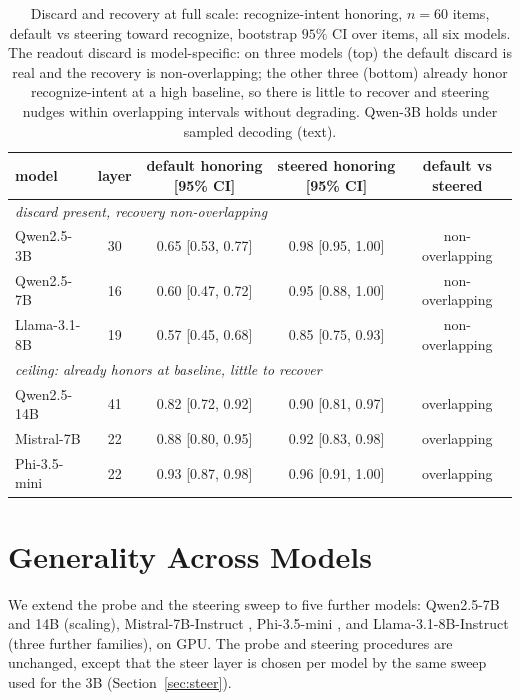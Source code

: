 \documentclass[11pt]{article}
\begin{document}
\begin{table}[t]
\centering\small
\setlength{\tabcolsep}{14pt}
\begin{tabular}{lcccc}
\toprule
model & layer & default honoring [95\% CI] & steered honoring [95\% CI] & default vs steered \\
\midrule
\multicolumn{5}{l}{\emph{discard present, recovery non-overlapping}} \\
Qwen2.5-3B   & 30 & 0.65 [0.53, 0.77] & 0.98 [0.95, 1.00] & non-overlapping \\
Qwen2.5-7B   & 16 & 0.60 [0.47, 0.72] & 0.95 [0.88, 1.00] & non-overlapping \\
Llama-3.1-8B & 19 & 0.57 [0.45, 0.68] & 0.85 [0.75, 0.93] & non-overlapping \\
\midrule
\multicolumn{5}{l}{\emph{ceiling: already honors at baseline, little to recover}} \\
Qwen2.5-14B  & 41 & 0.82 [0.72, 0.92] & 0.90 [0.81, 0.97] & overlapping \\
Mistral-7B   & 22 & 0.88 [0.80, 0.95] & 0.92 [0.83, 0.98] & overlapping \\
Phi-3.5-mini & 22 & 0.93 [0.87, 0.98] & 0.96 [0.91, 1.00] & overlapping \\
\bottomrule
\end{tabular}
\caption{Discard and recovery at full scale: recognize-intent honoring, $n{=}60$ items, default vs steering
toward recognize, bootstrap $95\%$ CI over items, all six models. The readout discard is model-specific: on
three models (top) the default discard is real and the recovery is non-overlapping; the other three (bottom)
already honor recognize-intent at a high baseline, so there is little to recover and steering nudges within
overlapping intervals without degrading. Qwen-3B holds under sampled decoding (text).}
\label{tab:scale}
\end{table}

\section{Generality Across Models}
\label{sec:general}
We extend the probe and the steering sweep to five further models: Qwen2.5-7B and 14B \citep{qwen2025}
(scaling), Mistral-7B-Instruct \citep{jiang2023mistral}, Phi-3.5-mini \citep{abdin2024phi3}, and
Llama-3.1-8B-Instruct \citep{dubey2024llama3} (three further families), on GPU. The probe and steering
procedures are unchanged, except that the steer layer is chosen per model by the same sweep used for the 3B
(Section~\ref{sec:steer}).
\end{document}
